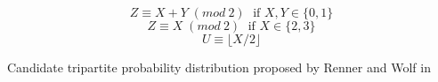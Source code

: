 \begin{table}
	    $$Z \equiv X + Y\; (mod\: 2)\; \text{ if } X,Y \in \{ 0,1\}$$ 
	    $$Z \equiv X\; (mod\: 2)\; \text{ if } X \in \{ 2,3\}$$ 
	    $$U \equiv \lfloor X/2 \rfloor $$
	    \caption{Candidate tripartite probability distribution proposed by Renner and Wolf in \cite{RW03}}
	    \label{Tab:candidate}
	\end{table}	    
    